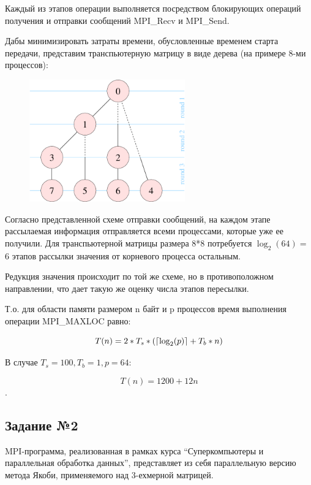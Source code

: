 \documentclass[a4paper]{article}
\DeclarePairedDelimiter\ceil{\lceil}{\rceil}
\begin{document}
Каждый из этапов операции выполняется посредством блокирующих операций получения и отправки сообщений MPI\_Recv и MPI\_Send.

Дабы минимизировать затраты времени, обусловленные временем старта передачи, представим транспьютерную матрицу в виде дерева (на примере 8-ми процессов):

\begin{figure}[htbp]
    \centering
    \includegraphics[width=0.6\textwidth]{pics/tree.png}
\end{figure}

Согласно представленной схеме отправки сообщений, на каждом этапе рассылаемая информация отправляется всеми процессами, которые уже ее получили. Для транспьютерной матрицы размера 8*8 потребуется $\log_2(64) =$ 6 этапов рассылки значения от корневого процесса остальным.

\newpage

Редукция значения происходит по той же схеме, но в противоположном направлении, что дает такую же оценку числа этапов пересылки.

Т.о. для области памяти размером n байт и p процессов время выполнения операции MPI\_MAXLOC равно:

$$ T(n) = 2 * T_s * (\ceil*{\log_2(p)} + T_b * n) $$

В случае $T_s = 100, T_b = 1, p = 64$:

$$ T(n) = 1200 + 12n $$.

\newpage

\subsection{Задание №2}

MPI-программа, реализованная в рамках курса “Суперкомпьютеры и параллельная обработка данных”, представляет из себя параллельную версию метода Якоби, применяемого над 3-ехмерной матрицей.
\end{document}
